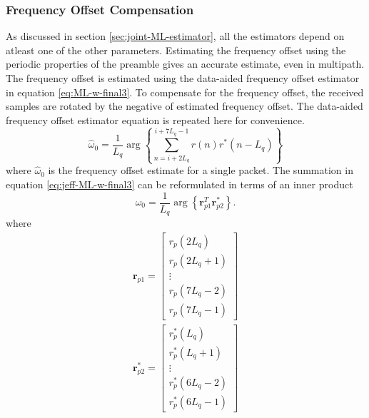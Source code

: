 \subsubsection{Frequency Offset Compensation}
\label{sec:jeffs_frequencyoffsetestimator}
As discussed in section \ref{sec:joint-ML-estimator}, all the estimators depend on atleast one of the other parameters.
Estimating the frequency offset using the periodic properties of the preamble gives an accurate estimate, even in multipath.
The frequency offset is estimated using the data-aided frequency offset estimator in equation \eqref{eq:ML-w-final3}.
To compensate for the frequency offset, the received samples are rotated by the negative of estimated frequency offset.
The data-aided frequency offset estimator equation is repeated here for convenience.
\begin{equation}
	\hat{\omega}_0 = \frac{1}{L_q} \arg\left\{ \sum_{n=i+2L_q}^{i+7L_q-1} r(n)r^\ast(n-L_q)\right\}
	\label{eq:jeff-ML-w-final3}
\end{equation}
where
$\hat{\omega}_0$ is the frequency offset estimate for a single packet.
The summation in equation \eqref{eq:jeff-ML-w-final3} can be reformulated in terms of an inner product
\begin{equation}
	\hat{\omega}_0 = \frac{1}{L_q} \arg\left\{ \mathbf{r}_{p1}^T \mathbf{r}^\ast_{p2}  \right\}.
	\label{eq:jeff-ML-w-final3_reformed}
\end{equation}
where 
\begin{align}
\mathbf{r}_{p1}
=     
\begin{bmatrix}
r_p(2L_q) 			\\
r_p(2L_q+1) 		\\
\vdots			\\
r_p(7L_q - 2)\\
r_p(7L_q - 1)
\end{bmatrix}
\label{eq:freq_offset_r1}
\end{align}
\begin{align}
\mathbf{r}^\ast_{p2}
=     
\begin{bmatrix}
r^\ast_p(L_q) 			\\
r^\ast_p(L_q+1) 		\\
\vdots			\\
r^\ast_p(6L_q - 2)\\
r^\ast_p(6L_q - 1)
\end{bmatrix}
\end{align}

